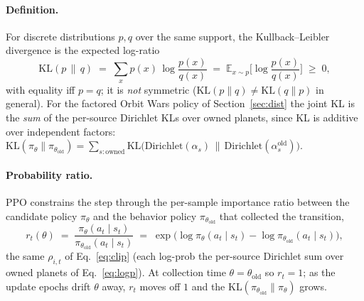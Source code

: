\documentclass[11pt]{article}
\newcommand{\E}{\mathbb{E}}
\newcommand{\KL}{\mathrm{KL}}
\newcommand{\pol}{\pi_\theta}
\newcommand{\polold}{\pi_{\theta_{\mathrm{old}}}}
\begin{document}
\paragraph{Definition.} For discrete distributions $p,q$ over the same support, the Kullback--Leibler
divergence is the expected log-ratio
\begin{equation}
\KL(p\,\|\,q) \;=\; \sum_{x} p(x)\,\log\frac{p(x)}{q(x)} \;=\; \E_{x\sim p}\!\Big[\log\frac{p(x)}{q(x)}\Big]
\;\ge\; 0,
\label{eq:kldef}
\end{equation}
with equality iff $p=q$; it is \emph{not} symmetric ($\KL(p\|q)\neq\KL(q\|p)$ in general). For the
factored Orbit Wars policy of Section~\ref{sec:dist} the joint KL is the \emph{sum} of the per-source
Dirichlet KLs over owned planets, since KL is additive over independent factors:
$\KL(\pol\|\polold)=\sum_{s:\text{owned}}\KL\big(\mathrm{Dirichlet}(\alpha_s)\,\|\,\mathrm{Dirichlet}(\alpha_s^{\mathrm{old}})\big)$.

\paragraph{Probability ratio.} PPO constrains the step through the per-sample importance ratio between
the candidate policy $\pol$ and the behavior policy $\polold$ that collected the transition,
\begin{equation}
r_t(\theta) \;=\; \frac{\pol(a_t\mid s_t)}{\polold(a_t\mid s_t)}
\;=\; \exp\!\big(\log\pol(a_t\mid s_t) - \log\polold(a_t\mid s_t)\big),
\label{eq:ratio}
\end{equation}
the same $\rho_{i,t}$ of Eq.~\eqref{eq:clip} (each log-prob the per-source Dirichlet sum over owned
planets of Eq.~\eqref{eq:logp}). At collection time $\theta=\theta_{\mathrm{old}}$ so $r_t=1$; as the update epochs
drift $\theta$ away, $r_t$ moves off $1$ and the KL$(\polold\|\pol)$ grows.
\end{document}
